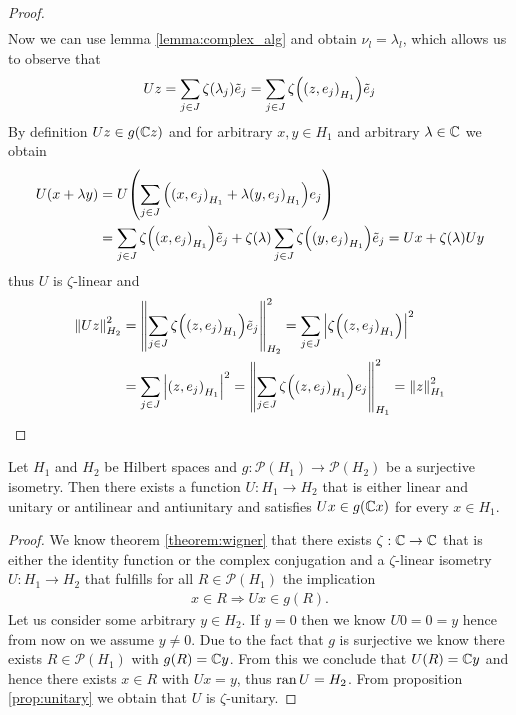 \begin{proof}
\begin{align*}
	\end{align*}
	Now we can use lemma \ref{lemma:complex_alg} and obtain $\nu_l = \lambda_l$, which allows us to observe that 
	\begin{align*}
		Uz = \sum_{j \in J} \zeta(\lambda_j) \tilde{e}_j = \sum_{j \in J} \zeta\pbraces{\pbraces{z, e_j}_{H_1}}\tilde{e}_j
	\end{align*}
	By definition $Uz \in g(\C z)$ and for arbitrary $x,y \in H_1$ and arbitrary $\lambda \in \C$ we obtain
	\begin{align*}
		U(x + \lambda y) &= U \pbraces{\sum_{j \in J} \pbraces{\pbraces{x, e_j}_{H_1} + \lambda \pbraces{y, e_j}_{H_1}} e_j} \\
		&= \sum_{j \in J} \zeta\pbraces{\pbraces{x, e_j}_{H_1}} \tilde{e}_j + \zeta(\lambda) \sum_{j \in J} \zeta\pbraces{\pbraces{y, e_j}_{H_1}} \tilde{e}_j = Ux + \zeta\pbraces{\lambda} Uy
	\end{align*}
	thus $U$ is $\zeta$-linear and 
	\begin{align*}
		\norm[H_2]{Uz}^2 &= \norm[H_2]{\sum_{j \in J} \zeta\pbraces{\pbraces{z, e_j}_{H_1}} \tilde{e}_j}^2 = \sum_{j \in J} \vbraces{\zeta\pbraces{\pbraces{z, e_j}_{H_1}}}^2  \\
		&= \sum_{j \in J} \vbraces{\pbraces{z, e_j}_{H_1}}^2 = \norm[H_1]{\sum_{j \in J} \zeta\pbraces{\pbraces{z, e_j}_{H_1}} e_j}^2 = \norm[H_1]{z}^2
	\end{align*}
\end{proof}


\begin{corollary}
	Let $H_1$ and $H_2$ be Hilbert spaces and $g: \mathcal{P}(H_1) \to \mathcal{P}(H_2)$ be a surjective isometry. Then there exists a function $U: H_1 \to H_2$ that is either linear and unitary or antilinear and antiunitary and satisfies $Ux \in g(\C x)$ for every $x \in H_1$.
\end{corollary}

\begin{proof}
	We know theorem \ref{theorem:wigner} that there exists $\zeta: \C \to \C$ that is either the identity function or the complex conjugation and a $\zeta$-linear isometry $U: H_1 \to H_2$ that fulfills for all $R \in \mathcal{P}(H_1)$ the implication
	\begin{align*}
		x \in R \Rightarrow Ux \in g(R).
	\end{align*}
	Let us consider some arbitrary $y \in H_2$. If $y = 0$ then we know $U0 = 0 = y$ hence from now on we assume $y \neq 0$. Due to the fact that $g$ is surjective we know there exists $R \in \mathcal{P}(H_1)$ with $g(R) = \C y$. From this we conclude that $U(R) = \C y$ and hence there exists $x \in R$ with $Ux = y$, thus $\ran U = H_2$. From proposition \ref{prop:unitary} we obtain that $U$ is $\zeta$-unitary.
\end{proof}